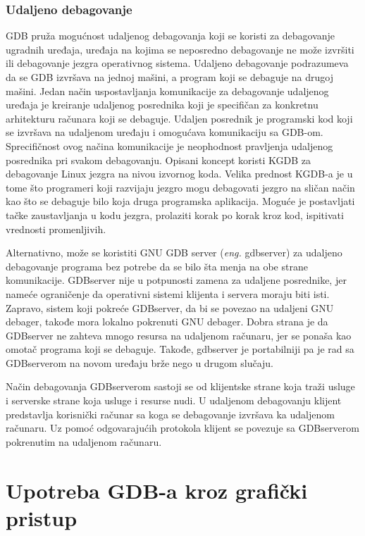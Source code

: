 \documentclass[a4paper]{article}
\begin{document}
\subsubsection{Udaljeno debagovanje}
\label{subsec:gdb_udaljeno}

GDB pruža mogućnost udaljenog debagovanja koji se koristi za debagovanje ugradnih uređaja, 
uređaja na kojima se neposredno debagovanje ne može izvršiti ili debagovanje jezgra operativnog sistema. 
Udaljeno debagovanje podrazumeva da se GDB izvršava na jednoj mašini, a program koji se debaguje na 
drugoj mašini.
Jedan način uspostavljanja komunikacije za debagovanje udaljenog uređaja je kreiranje udaljenog posrednika koji je specifičan za konkretnu arhitekturu računara koji se debaguje. Udaljen posrednik je programski kod koji se izvršava na udaljenom uređaju i omogućava komunikaciju sa GDB-om. Sprecifičnost ovog načina komunikacije je neophodnost pravljenja udaljenog posrednika pri svakom debagovanju. 
Opisani koncept koristi KGDB za debagovanje Linux jezgra na nivou izvornog koda. Velika prednost KGDB-a 
je u tome što programeri koji razvijaju jezgro mogu debagovati jezgro na sličan način kao što se 
debaguje bilo koja druga programska aplikacija. Moguće je postavljati tačke zaustavljanja u kodu jezgra, 
prolaziti korak po korak kroz kod, ispitivati vrednosti promenljivih.\cite{kgd}

Alternativno, može se koristiti GNU GDB server (\textit{eng.} gdbserver) za udaljeno debagovanje 
programa bez potrebe da se bilo šta menja na obe strane komunikacije. GDBserver nije u potpunosti 
zamena za udaljene posrednike, jer nameće ograničenje da operativni sistemi klijenta i servera 
moraju biti isti. Zapravo, sistem koji pokreće GDBserver, da bi se povezao na udaljeni GNU debager, 
takođe mora lokalno pokrenuti GNU debager. Dobra strana je da GDBserver ne zahteva mnogo 
resursa na udaljenom računaru, jer se ponaša kao omotač programa koji se debaguje. 
Takođe, gdbserver je portabilniji pa je rad sa GDBserverom na novom uređaju brže nego u drugom slučaju. 

Način debagovanja GDBserverom sastoji se od klijentske strane koja traži usluge i serverske strane 
koja usluge i resurse nudi. U udaljenom debagovanju klijent predstavlja korisnički računar sa koga se 
debagovanje izvršava ka udaljenom računaru. Uz pomoć odgovarajućih protokola klijent se povezuje 
sa GDBserverom pokrenutim na udaljenom računaru\cite{master_rad}. 


\section{Upotreba GDB-a kroz grafički pristup}
\label{subsec:gui}
\end{document}
